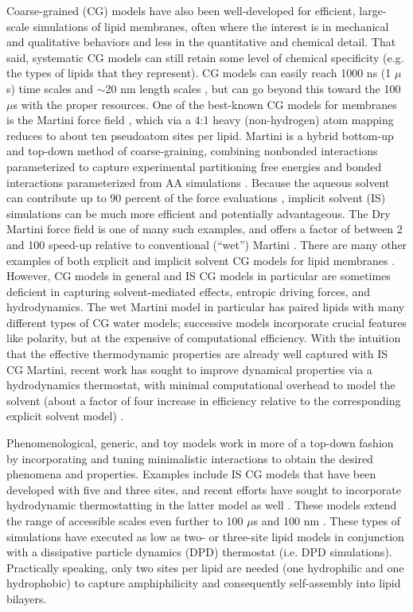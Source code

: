 \documentclass[9pt,bestpractices]{livecoms}
\begin{document}
Coarse-grained (CG) models have also been well-developed for efficient, large-scale simulations of lipid membranes, often where the interest is in mechanical and qualitative behaviors and less in the quantitative and chemical detail.
That said, systematic CG models can still retain some level of chemical specificity (e.g. the types of lipids that they represent).
CG models can easily reach 1000 ns (1 $\mu$s) time scales and $\sim$20 nm length scales \cite{Smirnova2015}, but can go beyond this toward the 100 $\mu$s with the proper resources.
One of the best-known CG models for membranes is the Martini force field \cite{Marrink2004,Marrink2007a}, which via a 4:1 heavy (non-hydrogen) atom mapping reduces to about ten pseudoatom sites per lipid.
Martini is a hybrid bottom-up and top-down method of coarse-graining, combining nonbonded interactions parameterized to capture experimental partitioning free energies and bonded interactions parameterized from AA simulations \cite{Marrink2013}.
Because the aqueous solvent can contribute up to 90 percent of the force evaluations \cite{Arnarez2014}, implicit solvent (IS) simulations can be much more efficient and potentially advantageous.
The Dry Martini force field is one of many such examples, and offers a factor of between 2 and 100 speed-up relative to conventional (``wet'') Martini \cite{Arnarez2014}.
There are many other examples of both explicit and implicit solvent CG models for lipid membranes \cite{Ramakrishnan2014c,Brannigan2006}.
However, CG models in general and IS CG models in particular are sometimes deficient in capturing solvent-mediated effects, entropic driving forces, and hydrodynamics.
The wet Martini model in particular has paired lipids with many different types of CG water models; successive models incorporate crucial features like polarity, but at the expensive of computational efficiency.
With the intuition that the effective thermodynamic properties are already well captured with IS CG Martini, recent work has sought to improve dynamical properties via a hydrodynamics thermostat, with minimal computational overhead to model the solvent (about a factor of four increase in efficiency relative to the corresponding explicit solvent model) \cite{Zgorski2016}.

Phenomenological, generic, and toy models work in more of a top-down fashion by incorporating and tuning minimalistic interactions to obtain the desired phenomena and properties.
Examples include IS CG models that have been developed with five \cite{Brannigan2005b} and three \cite{Cooke2005a} sites, and recent efforts have sought to incorporate hydrodynamic thermostatting in the latter model as well \cite{Wang2013}.
These models extend the range of accessible scales even further to 100 $\mu$s and 100 nm \cite{Smirnova2015}.
These types of simulations have executed as low as two- or three-site lipid models in conjunction with a dissipative particle dynamics (DPD) thermostat (i.e. DPD simulations).
Practically speaking, only two sites per lipid are needed (one hydrophilic and one hydrophobic) to capture amphiphilicity and consequently self-assembly into lipid bilayers.
\end{document}

